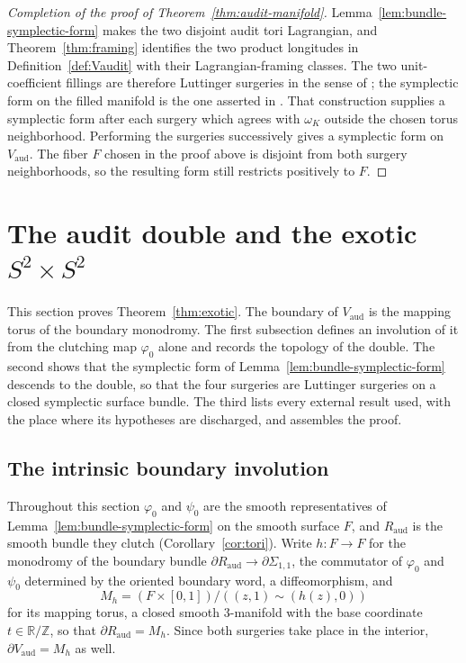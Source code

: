 \documentclass[11pt]{article}
\theoremstyle{definition}
\begin{document}
\begin{proof}[Completion of the proof of
Theorem~\ref{thm:audit-manifold}]
Lemma~\ref{lem:bundle-symplectic-form} makes the two disjoint audit tori
Lagrangian, and Theorem~\ref{thm:framing} identifies the two product
longitudes in Definition~\ref{def:Vaudit} with their Lagrangian-framing
classes.  The two unit-coefficient fillings are therefore Luttinger
surgeries in the sense of \cite[Definition~2.1]{ADK}; the symplectic form on
the filled manifold is the one asserted in \cite[Proposition~2.2]{ADK}.  That construction supplies a
symplectic form after each surgery which agrees with $\omega_K$ outside the
chosen torus neighborhood.  Performing the surgeries successively gives a
symplectic form on $V_{\mathrm{aud}}$.  The fiber $F$ chosen in the proof
above is disjoint from both surgery neighborhoods, so the resulting form
still restricts positively to $F$.
\end{proof}

\section{The audit double and the exotic $S^2\times S^2$}\label{sec:double}

This section proves Theorem~\ref{thm:exotic}.  The boundary of
$V_{\mathrm{aud}}$ is the mapping torus of the boundary monodromy.  The
first subsection defines an involution of it from the clutching map
$\varphi_0$ alone and records the topology of the double.  The second shows
that the symplectic form of Lemma~\ref{lem:bundle-symplectic-form} descends
to the double, so that the four surgeries are Luttinger surgeries on a
closed symplectic surface bundle.  The third lists every external result
used, with the place where its hypotheses are discharged, and assembles the
proof.

\subsection{The intrinsic boundary involution}\label{sec:sigma-aud}

Throughout this section $\varphi_0$ and $\psi_0$ are the smooth
representatives of Lemma~\ref{lem:bundle-symplectic-form} on the smooth
surface $F$, and $R_{\mathrm{aud}}$ is the smooth bundle they clutch
(Corollary~\ref{cor:tori}).  Write $h\colon F\to F$ for the monodromy of
the boundary bundle $\partial R_{\mathrm{aud}}\to\partial\Sigma_{1,1}$,
the commutator of $\varphi_0$ and $\psi_0$ determined by the oriented
boundary word, a diffeomorphism, and
\[
 M_h=(F\times[0,1])/((z,1)\sim(h(z),0))
\]
for its mapping torus, a closed smooth 3-manifold with the base coordinate
$t\in\mathbb R/\mathbb Z$, so that $\partial R_{\mathrm{aud}}=M_h$.
Since both surgeries take place in the interior,
$\partial V_{\mathrm{aud}}=M_h$ as well.
\end{document}

